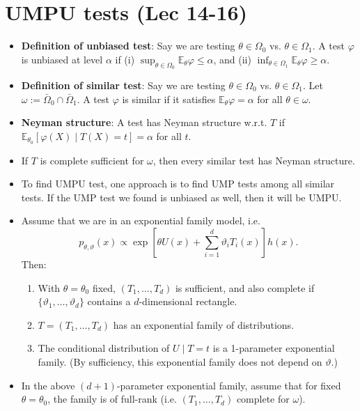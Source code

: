 \documentclass[twoside]{article}
\newcommand\bbE{\mathbb{E}}
\newcommand\om{\omega}
\newcommand\Om{\Omega}
\def\t{\theta}
\newcommand\vt{\vartheta}
\begin{document}
\section*{UMPU tests (Lec 14-16)}
\begin{itemize}
\item \textbf{Definition of unbiased test}: Say we are testing $\t \in \Om_0$ vs. $\t \in \Om_1$. A test $\varphi$ is unbiased at level $\alpha$ if (i) $\displaystyle\sup_{\t \in \Om_0} \bbE_\t \varphi \leq \alpha$, and (ii) $\displaystyle\inf_{\t \in \Om_1} \bbE_\t \varphi \geq \alpha$.

\item \textbf{Definition of similar test}: Say we are testing $\t \in \Om_0$ vs. $\t \in \Om_1$. Let $\om := \bar{\Om}_0 \cap \bar{\Om}_1$. A test $\varphi$ is similar if it satisfies $\bbE_\t \varphi = \alpha$ for all $\t \in \om$.

\item \textbf{Neyman structure}: A test has Neyman structure w.r.t. $T$ if $\bbE_{\t_0} [\varphi(X) \mid T(X) = t] = \alpha$ for all $t$.

\item If $T$ is complete sufficient for $\om$, then every similar test has Neyman structure.

\item To find UMPU test, one approach is to find UMP tests among all similar tests. If the UMP test we found is unbiased as well, then it will be UMPU.

\item Assume that we are in an exponential family model, i.e. 
\begin{equation*} p_{\t, \vt}(x) \propto \exp \left[ \t U(x) + \sum_{i=1}^d \vt_i T_i(x) \right]h(x). \end{equation*}
Then:
\begin{enumerate}
\item With $\t = \t_0$ fixed, $(T_1, \dots, T_d)$ is sufficient, and also complete if $\{ \vt_1, \dots, \vt_d \}$ contains a $d$-dimensional rectangle.
\item $T = (T_1, \dots, T_d)$ has an exponential family of distributions.
\item The conditional distribution of $U \mid T = t$ is a 1-parameter exponential family. (By sufficiency, this exponential family does not depend on $\vt$.)
\end{enumerate}

\item In the above $(d+1)$-parameter exponential family, assume that for fixed $\t = \t_0$, the family is of full-rank (i.e. $(T_1, \dots, T_d)$ complete for $\om$).


\end{itemize}
\end{document}
